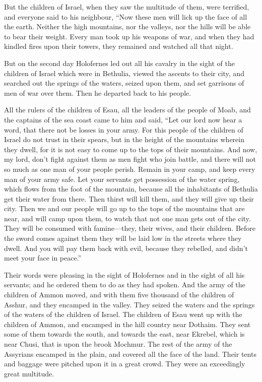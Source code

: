  But the children of Israel, when they saw the multitude of
them, were terrified, and everyone said to his neighbour, ``Now these
men will lick up the face of all the earth. Neither the high mountains,
nor the valleys, nor the hills will be able to bear their weight.
 Every man took up his weapons of war, and when they had
kindled fires upon their towers, they remained and watched all that
night.

 But on the second day Holofernes led out all his cavalry in
the sight of the children of Israel which were in Bethulia, 
viewed the ascents to their city, and searched out the springs of the
waters, seized upon them, and set garrisons of men of war over them.
Then he departed back to his people.

 All the rulers of the children of Esau, all the leaders of
the people of Moab, and the captains of the sea coast came to him and
said,  ``Let our lord now hear a word, that there not be
losses in your army.  For this people of the children of
Israel do not trust in their spears, but in the height of the mountains
wherein they dwell, for it is not easy to come up to the tops of their
mountains.  And now, my lord, don't fight against them as
men fight who join battle, and there will not so much as one man of your
people perish.  Remain in your camp, and keep every man of
your army safe. Let your servants get possession of the water spring,
which flows from the foot of the mountain,  because all the
inhabitants of Bethulia get their water from there. Then thirst will
kill them, and they will give up their city. Then we and our people will
go up to the tops of the mountains that are near, and will camp upon
them, to watch that not one man gets out of the city.  They
will be consumed with famine---they, their wives, and their children.
Before the sword comes against them they will be laid low in the streets
where they dwell.  And you will pay them back with evil,
because they rebelled, and didn't meet your face in peace.''

 Their words were pleasing in the sight of Holofernes and
in the sight of all his servants; and he ordered them to do as they had
spoken.  And the army of the children of Ammon moved, and
with them five thousand of the children of Asshur, and they encamped in
the valley. They seized the waters and the springs of the waters of the
children of Israel.  The children of Esau went up with the
children of Ammon, and encamped in the hill country near Dothaim. They
sent some of them towards the south, and towards the east, near Ekrebel,
which is near Chusi, that is upon the brook Mochmur. The rest of the
army of the Assyrians encamped in the plain, and covered all the face of
the land. Their tents and baggage were pitched upon it in a great crowd.
They were an exceedingly great multitude.


